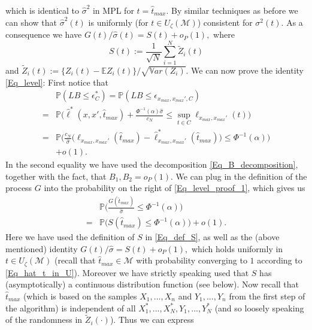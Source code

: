 \documentclass[conference]{IEEEtran}
\begin{document}
which is identical to $\hat \sigma^2$ in MPL for $t=\hat t_{max}$.
By similar techniques as before we can show that $\hat \sigma^2(t)$ is uniformly (for $t \in U_\zeta(\mathcal{
M})$) consistent for $\sigma^2(t)$. As a consequence we have
$
G(t)/\hat \sigma(t) = S(t) + o_P(1),
$
where 
\begin{equation} \label{Eq_def_S}
    S(t) :=\frac{1}{\sqrt{N}}\sum_{i=1}^N \tilde Z_i(t)
\end{equation}
and $\tilde Z_i(t) := \{Z_i(t)-\mathbb{E}Z_i(t)\}/\sqrt{\mathbb{V}ar(Z_i)}$. We can now prove the identity \eqref{Eq_level}: 
First notice that 
\begin{align} \label{Eq_level_proof_1}
    & \mathbb{P}(LB \le \epsilon_{C}^*) = \mathbb{P}(LB \le \epsilon_{x_{max},x_{max}',C})\\
    =&\mathbb{P}\Big(    \hat \ell^*(x,x',\hat t_{max}) + \frac{\Phi^{-1}(\alpha) \hat \sigma}{c_N}\le \sup_{t \in C}\ell_{x_{max},x_{max}'}(t)\Big) \nonumber \\
    = & \mathbb{P}\Big(   \frac{c_N}{\hat \sigma}  \big( \ell_{x_{max},x_{max}'}( \hat t_{max})- \hat\ell_{x_{max},x_{max}'}^*(\hat t_{max})\big) \le \Phi^{-1}(\alpha) \Big) \nonumber \\
    & +o(1). \nonumber
\end{align}
In the second equality we have used the decomposition \eqref{Eq_B_decomposition}, together with the fact, that $B_1, B_2 = o_P(1)$. We can plug in the definition of the process $G$ into the probability on the right of \eqref{Eq_level_proof_1}, which gives us 
\begin{align}\label{Eq_Berry_1}
& \mathbb{P}\Big(   \frac{G(\hat t_{max})}{\hat \sigma}  \le \Phi^{-1}(\alpha) \Big) \\
=& \mathbb{P}\Big(   S(\hat t_{max})   \le \Phi^{-1}(\alpha) \Big) +o(1). \nonumber
\end{align}
Here we have used the definition of $S$ in \eqref{Eq_def_S}, as well as the (above mentioned) identity $
G(t)/\hat \sigma = S(t) + o_P(1),
$
which holds uniformly in $t \in U_\zeta(\mathcal{M})$ (recall that $\hat t_{max} \in \mathcal{M}$ with probability converging to $1$ according to \eqref{Eq_hat_t_in_U}).
Moreover we have strictly speaking used that $S$ has (asymptotically)  a  continuous distribution function (see below).
Now recall that $\hat t_{max}$ (which is based on the samples $X_1,...,X_n$ and $Y_1,...,Y_n$ from the first step of the algorithm) is independent of all $X_1^*,...,X_N^*, Y_1,...,Y_N^*$ (and so loosely speaking of the randomness in $\tilde Z_i(\cdot)$). Thus we can express
\end{document}
